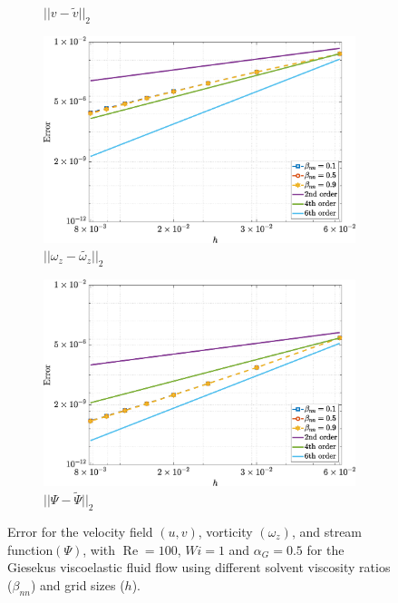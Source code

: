 \documentclass[preprint, 12pt]{elsarticle}
\begin{document}
\begin{figure}[H]
\begin{subfigure}[b]{.46\textwidth}
        \caption{$||v - \widetilde{v}||_{2}$}
        \label{error_v_2nd_Case1_giesekus_alphaG_0.5}
    \end{subfigure}
    \qquad
    \begin{subfigure}[b]{.46\textwidth}
        \includegraphics[width=\textwidth]{NormErr_2nd_Re_100_Wi_1_epsilon_0_xi_0_alphaG_0.5_Dt_1e-06_at_0.05_tipsim_1_MMS_12_Wz.eps}
        \caption{$||\omega_{z} - \widetilde{\omega_{z}}||_{2}$}
        \label{error_wz_2nd_Case1_giesekus_alphaG_0.5}
    \end{subfigure}
    \qquad
    \begin{subfigure}[b]{.46\textwidth}
        \includegraphics[width=\textwidth]{NormErr_2nd_Re_100_Wi_1_epsilon_0_xi_0_alphaG_0.5_Dt_1e-06_at_0.05_tipsim_1_MMS_12_Psi.eps}
        \caption{$||\Psi - \widetilde{\Psi}||_{2}$}
        \label{error_psi_2nd_Case1_oldorydbgiesekus_alphaG_0.5}
    \end{subfigure}
    \vspace{0.02cm}
    \caption{Error for the velocity field $({u},{v})$, vorticity $({\omega_{z}})$, and stream function$({\Psi})$, with $\operatorname{Re}=100$, $Wi=1$ and $\alpha_G=0.5$ for the Giesekus viscoelastic fluid flow using different solvent viscosity ratios ($\beta_{nn}$) and grid sizes ($h$).\label{GEerror051}}
\end{figure}
\end{document}
